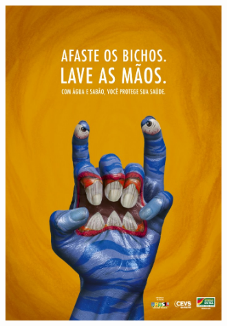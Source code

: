 \begin{figure}[htpb!]
\centering
\includegraphics[width=3.27083in,height=4.76432in]{./media/image10.jpeg}
\end{figure}

